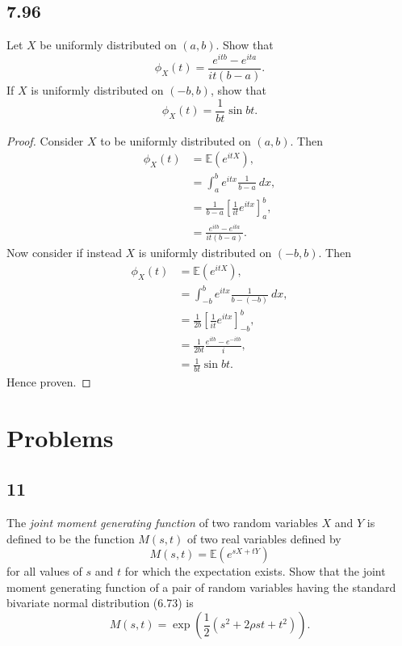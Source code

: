 \documentclass{article}
\newcommand{\E}[1]{\mathbb{E}(#1)}
\begin{document}
\subsection*{7.96}
Let $X$ be uniformly distributed on $(a,b)$. Show that
\begin{equation*}
    \phi_X(t) = \frac{e^{itb}-e^{ita}}{it(b-a)}.
\end{equation*}
If $X$ is uniformly distributed on $(-b,b)$, show that
\begin{equation*}
    \phi_X(t) = \frac{1}{bt}\sin bt.
\end{equation*}

\begin{proof}
    Consider $X$ to be uniformly distributed on $(a,b)$. Then
    \begin{align*}
        \phi_X(t) & = \E{e^{itX}},                                       \\
                  & = \int_a^b e^{itx}\frac{1}{b-a} \ dx,                \\
                  & = \frac{1}{b-a}\left[\frac{1}{it}e^{itx}\right]_a^b, \\
                  & =\frac{e^{itb}-e^{ita}}{it(b-a)}.
    \end{align*}
    Now consider if instead $X$ is uniformly distributed on $(-b,b)$. Then
    \begin{align*}
        \phi_X(t) & = \E{e^{itX}},                                         \\
                  & = \int_{-b}^b e^{itx}\frac{1}{b-(-b)} \ dx,            \\
                  & = \frac{1}{2b}\left[\frac{1}{it}e^{itx}\right]_{-b}^b, \\
                  & = \frac{1}{2bt}\frac{e^{itb} - e^{-itb}}{i},           \\
                  & = \frac{1}{bt}\sin bt.
    \end{align*}
    Hence proven.
\end{proof}

\section*{Problems}
\subsection*{11}
The \textit{joint moment generating function} of two random variables $X$ and $Y$
is defined to be the function $M(s,t)$ of two real variables defined by
\begin{equation*}
    M(s,t) = \E{e^{sX+tY}}
\end{equation*}
for all values of $s$ and $t$ for which the expectation exists. Show that the
joint moment generating function of a pair of random variables having the
standard bivariate normal distribution (6.73) is
\begin{equation*}
    M(s,t) = \exp\left(\frac{1}{2}(s^2 + 2\rho st + t^2)\right).
\end{equation*}
\end{document}

